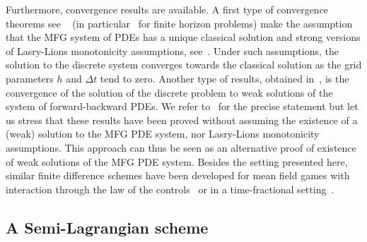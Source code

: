 \documentclass{amsproc}
\theoremstyle{definition}
\theoremstyle{remark}
\numberwithin{equation}{section}
\begin{document}
Furthermore, convergence results are available. A first type of convergence theorems see ~\cite{MR2679575,MR2888257,MR3097034} (in particular~\cite[Theorem 8]{MR2679575} for finite horizon problems) make the assumption that the MFG system of PDEs has a unique classical solution and strong versions of Lasry-Lions monotonicity assumptions, see~\cite{MR2269875,MR2271747,MR2295621}. Under such assumptions, 
the solution to the discrete system converges towards the classical solution as the grid parameters $h$ and $\Delta t$ tend to zero. Another type of results, obtained in~\cite{MR3452251}, is the  convergence of the solution of the discrete problem to weak solutions of the system of forward-backward PDEs. We refer to~\cite{MR3452251} for the precise statement but let us stress that these results have been proved without assuming the existence of a (weak) solution to the MFG PDE system, nor  Lasry-Lions monotonicity assumptions. This approach can thus be seen as an alternative proof of existence of weak solutions of the MFG PDE system. Besides the setting presented here, similar finite difference schemes have been developed for mean field games with interaction through the law of the controls~\cite{achdouKobeissi2020mfgcfinitediff} or in a time-fractional setting~\cite{camilli2020approximation-timefrac}.


\subsection{A Semi-Lagrangian scheme}
\end{document}
